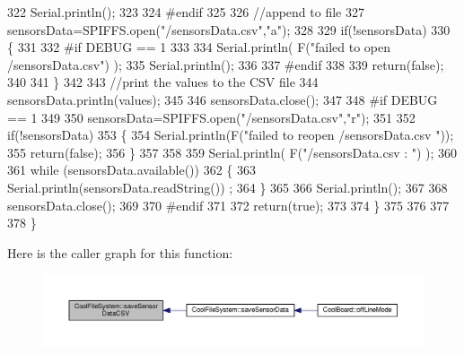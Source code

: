 \begin{DoxyCode}
322         Serial.println();
323     
324 \textcolor{preprocessor}{    #endif}
325 
326         \textcolor{comment}{//append to file}
327         sensorsData=SPIFFS.open(\textcolor{stringliteral}{"/sensorsData.csv"},\textcolor{stringliteral}{"a"});
328         
329         \textcolor{keywordflow}{if}(!sensorsData)
330         \{
331         
332 \textcolor{preprocessor}{        #if DEBUG == 1}
333             
334             Serial.println( F(\textcolor{stringliteral}{"failed to open /sensorsData.csv"}) );
335             Serial.println();
336 
337 \textcolor{preprocessor}{        #endif}
338             
339             \textcolor{keywordflow}{return}(\textcolor{keyword}{false});
340         
341         \}
342 
343         \textcolor{comment}{//print the values to the CSV file}
344         sensorsData.println(values);
345         
346         sensorsData.close();
347 
348 \textcolor{preprocessor}{    #if DEBUG == 1}
349 
350         sensorsData=SPIFFS.open(\textcolor{stringliteral}{"/sensorsData.csv"},\textcolor{stringliteral}{"r"});
351         
352         \textcolor{keywordflow}{if}(!sensorsData)
353         \{
354             Serial.println(F(\textcolor{stringliteral}{"failed to reopen /sensorsData.csv "}));
355             \textcolor{keywordflow}{return}(\textcolor{keyword}{false});      
356         \}
357 
358         
359         Serial.println( F(\textcolor{stringliteral}{"/sensorsData.csv : "}) );
360 
361         \textcolor{keywordflow}{while} (sensorsData.available()) 
362         \{
363             Serial.println(sensorsData.readString()) ;
364         \}
365         
366         Serial.println();
367         
368         sensorsData.close();
369         
370 \textcolor{preprocessor}{    #endif      }
371         
372         \textcolor{keywordflow}{return}(\textcolor{keyword}{true});
373     
374     \}   
375 
376 
377 
378 \}
\end{DoxyCode}
Here is the caller graph for this function\+:\nopagebreak
\begin{figure}[H]
\begin{center}
\leavevmode
\includegraphics[width=350pt]{db/d0c/class_cool_file_system_ab78704d5d21ce10fc6f1138ab5ab46c8_icgraph}
\end{center}
\end{figure}
\mbox{\label{class_cool_file_system_adfa8e2e80641ae6f0cceabd348a9b841}} 
